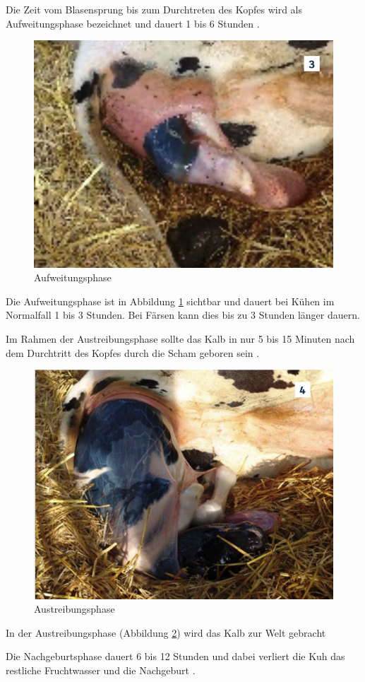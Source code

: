 Die Zeit vom Blasensprung bis zum Durchtreten des Kopfes wird als Aufweitungsphase bezeichnet und dauert 1 bis 6 Stunden \citep[S. 7 ]{Traulsen2013}. 
\begin{figure}[H]
	\center
	\includegraphics[scale=.45]{Grafiken/aufweitungsphase.png}
	\caption{ Aufweitungsphase }
	\label{fig: Aufweitungsphase}
\end{figure} 

Die Aufweitungsphase ist in Abbildung \ref{fig: Aufweitungsphase} sichtbar und dauert bei Kühen im Normalfall 1 bis 3 Stunden. Bei Färsen kann dies bis zu 3 Stunden länger dauern. \citep[S. 7 ]{Traulsen2013}

Im Rahmen der Austreibungsphase sollte das Kalb in nur 5 bis 15 Minuten nach dem Durchtritt des Kopfes durch die Scham geboren sein \citep[S. 8 ]{Traulsen2013}.  


\begin{figure}[H]
	\center
	\includegraphics[scale=.45]{Grafiken/austreibungsphase.png}
	\caption{Austreibungsphase}
	\label{fig: Austreibungsphase}
\end{figure}

 In der Austreibungsphase (Abbildung \ref{fig: Austreibungsphase}) wird das Kalb zur Welt gebracht \citep[S. 8 ]{Traulsen2013}

Die Nachgeburtsphase dauert 6 bis 12 Stunden und dabei verliert die Kuh das restliche Fruchtwasser und die Nachgeburt \citep[S. 8 ]{Traulsen2013}.  
